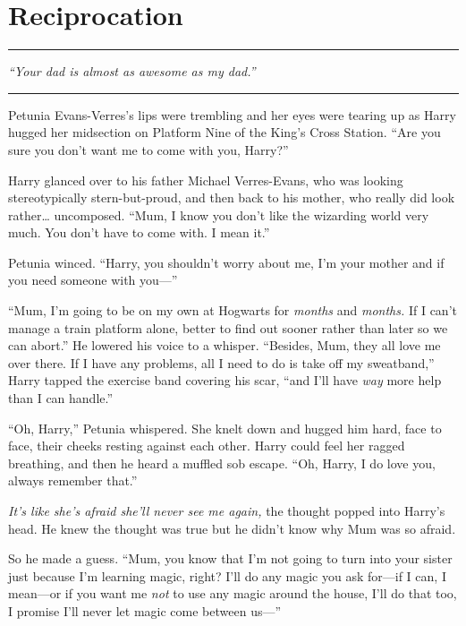 \chapter{Reciprocation}

\begin{center}\rule{3in}{0.4pt}\end{center}

\emph{``Your dad is almost as awesome as my dad.''}

\begin{center}\rule{3in}{0.4pt}\end{center}

Petunia Evans-Verres's lips were trembling and her eyes were tearing up
as Harry hugged her midsection on Platform Nine of the King's Cross
Station. ``Are you sure you don't want me to come with you, Harry?''

Harry glanced over to his father Michael Verres-Evans, who was looking
stereotypically stern-but-proud, and then back to his mother, who really
did look rather\ldots{} uncomposed. ``Mum, I know you don't like the
wizarding world very much. You don't have to come with. I mean it.''

Petunia winced. ``Harry, you shouldn't worry about me, I'm your mother
and if you need someone with you---''

``Mum, I'm going to be on my own at Hogwarts for \emph{months} and
\emph{months.} If I can't manage a train platform alone, better to find
out sooner rather than later so we can abort.'' He lowered his voice to
a whisper. ``Besides, Mum, they all love me over there. If I have any
problems, all I need to do is take off my sweatband,'' Harry tapped the
exercise band covering his scar, ``and I'll have \emph{way} more help
than I can handle.''

``Oh, Harry,'' Petunia whispered. She knelt down and hugged him hard,
face to face, their cheeks resting against each other. Harry could feel
her ragged breathing, and then he heard a muffled sob escape. ``Oh,
Harry, I do love you, always remember that.''

\emph{It's like she's afraid she'll never see me again,} the thought
popped into Harry's head. He knew the thought was true but he didn't
know why Mum was so afraid.

So he made a guess. ``Mum, you know that I'm not going to turn into your
sister just because I'm learning magic, right? I'll do any magic you ask
for---if I can, I mean---or if you want me \emph{not} to use any magic
around the house, I'll do that too, I promise I'll never let magic come
between us---''

